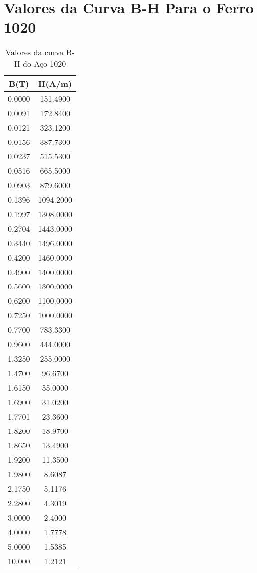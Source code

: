 \section*{Valores da Curva B-H Para o Ferro 1020}

\begin{table}[ht!]
	\centering
	\begin{tabular}{ c c }
	B(T) & H(A/m) \\
	\hline \hline
	0.0000  &  151.4900\\
	0.0091  &  172.8400\\
	0.0121  &  323.1200\\
	0.0156  &  387.7300\\
	0.0237  &  515.5300\\
	0.0516  &  665.5000\\
	0.0903  &  879.6000\\
	0.1396  & 1094.2000\\
	0.1997  & 1308.0000\\
	0.2704  & 1443.0000\\
	0.3440  & 1496.0000\\
	0.4200  & 1460.0000\\
	0.4900  & 1400.0000\\
	0.5600  & 1300.0000\\
	0.6200  & 1100.0000\\
	0.7250  & 1000.0000\\
	0.7700  &  783.3300\\
	0.9600  &  444.0000\\
	1.3250  &  255.0000\\
	1.4700  &   96.6700\\
	1.6150  &   55.0000\\
	1.6900  &   31.0200\\
	1.7701  &   23.3600\\
	1.8200  &   18.9700\\
	1.8650  &   13.4900\\
	1.9200  &   11.3500\\
	1.9800  &    8.6087\\
	2.1750  &    5.1176\\
	2.2800  &    4.3019\\
	3.0000  &    2.4000\\
	4.0000  &    1.7778\\
	5.0000  &    1.5385\\
	10.000  &   1.2121 
	\end{tabular} 
	\caption{Valores da curva B-H do Aço 1020}
	\label{tab:apendices:ferro1020}
\end{table}
